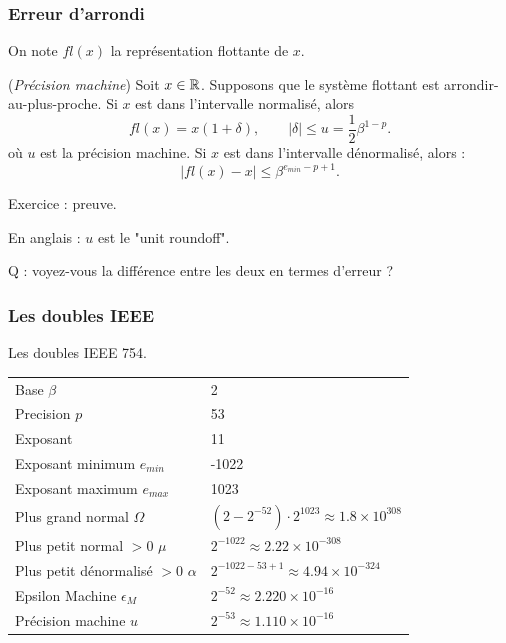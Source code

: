 \documentclass{beamer}
\begin{document}

\begin{frame}
\frametitle{Erreur d'arrondi}

On note $fl(x)$ la représentation flottante de $x$.

\begin{theorem}
(\emph{Précision machine})
Soit $x\in\mathbb{R}$. 
Supposons que le système flottant est arrondir-au-plus-proche.
Si $x$ est dans l'intervalle normalisé, alors
$$
fl(x) = x(1+\delta), \qquad |\delta| \leq u= \frac{1}{2} \beta^{1-p}.
$$
où $u$ est la précision machine.
Si $x$ est dans l'intervalle dénormalisé, alors :
$$
|fl(x) - x| \leq \beta^{e_{min}-p+1}.
$$
\end{theorem}

Exercice : preuve.

En anglais : $u$ est le "unit roundoff".

Q : voyez-vous la différence entre les deux en termes d'erreur ?

\end{frame}



\begin{frame}
\frametitle{Les doubles IEEE}

Les doubles IEEE 754.

\begin{center}
\begin{tabular}{|ll|}
\hline
Base $\beta$ & 2  \\
Precision $p$ & 53 \\
Exposant & 11 \\
Exposant minimum $e_{min}$ & -1022 \\
Exposant maximum $e_{max}$ & 1023 \\
Plus grand normal $\Omega$ & $\left(2-2^{-52}\right)\cdot 2^{1023} \approx 1.8\times 10^{308}$ \\
Plus petit normal $>0$ $\mu$ & $2^{-1022} \approx 2.22\times 10^{-308}$ \\
Plus petit dénormalisé $>0$ $\alpha$ & $2^{-1022-53+1} \approx 4.94\times 10^{-324}$ \\
Epsilon Machine $\epsilon_M$ & $2^{-52} \approx 2.220\times 10^{-16}$ \\
Précision machine $u$ & $2^{-53} \approx 1.110\times 10^{-16}$ \\
\hline
\end{tabular}
\end{center}

\end{frame}
\end{document}
